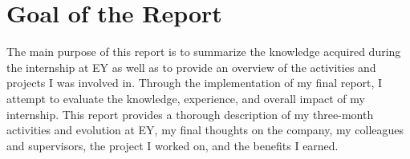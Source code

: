 \section{Goal of the Report}

The main purpose of this report is to summarize the knowledge acquired during
the internship at EY as well as to provide an overview of the activities and
projects I was involved in. Through the implementation of my final report, I
attempt to evaluate the knowledge, experience, and overall impact of my
internship. This report provides a thorough description of my three-month
activities and evolution at EY, my final thoughts on the company, my colleagues
and supervisors, the project I worked on, and the benefits I earned.